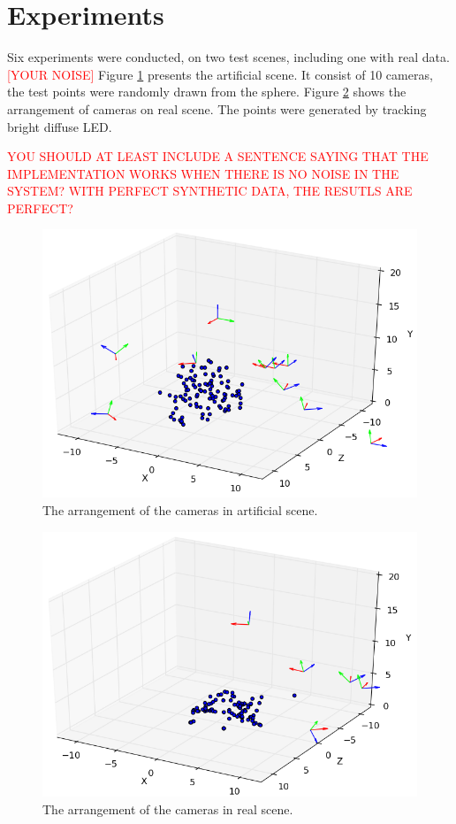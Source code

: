 \documentclass[12pt]{article}
\begin{document}
\section{Experiments}

Six experiments were conducted, on two test scenes, including one with real
data. \textcolor{red}{[YOUR NOISE]} Figure \ref{fig:artificial} presents the artificial scene. It consist of 10 cameras, the test points  were randomly drawn from the sphere. Figure \ref{fig:real} shows the arrangement of cameras on  real scene. The points were
generated by tracking bright diffuse LED.

\textcolor{red}{YOU SHOULD AT LEAST INCLUDE A SENTENCE SAYING THAT THE IMPLEMENTATION WORKS WHEN THERE IS NO NOISE IN THE SYSTEM? WITH PERFECT SYNTHETIC DATA, THE RESUTLS ARE PERFECT?}

\begin{figure}[ht]
\centering
\includegraphics[scale=0.5]{artificial.png}
\caption{The arrangement of the cameras in artificial scene.}
\label{fig:artificial}
\end{figure}

\begin{figure}[ht]
\centering
\includegraphics[scale=0.5]{real.png}
\caption{The arrangement of the cameras in real scene.}
\label{fig:real}
\end{figure}
\end{document}
